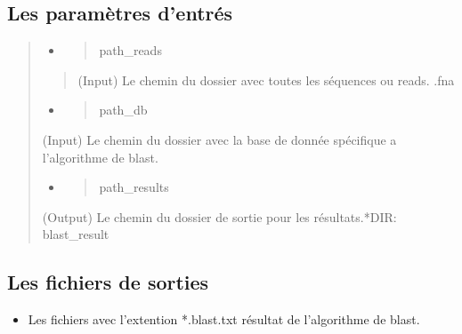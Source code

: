 \documentclass[letterpaper,10pt,french]{sphinxmanual}
\begin{document}
\subsection{Les paramètres d’entrés}
\label{\detokenize{bash/launch_blast_analyse.sh:les-parametres-d-entres}}\begin{quote}
\begin{itemize}
\item {} \begin{quote}\begin{description}
\item[{\sphinxhyphen{}path\_reads}] \leavevmode
\end{description}\end{quote}

\end{itemize}
\begin{quote}

(Input) Le chemin du dossier avec toutes les séquences ou reads. .fna
\end{quote}
\begin{itemize}
\item {} \begin{quote}\begin{description}
\item[{\sphinxhyphen{}path\_db}] \leavevmode
\end{description}\end{quote}

\end{itemize}

(Input) Le chemin du dossier avec la base de donnée spécifique a l’algorithme de blast.
\begin{itemize}
\item {} \begin{quote}\begin{description}
\item[{\sphinxhyphen{}path\_results}] \leavevmode
\end{description}\end{quote}

\end{itemize}

(Output) Le chemin du dossier de sortie pour les résultats.*DIR: blast\_result
\end{quote}


\subsection{Les fichiers de sorties}
\label{\detokenize{bash/launch_blast_analyse.sh:les-fichiers-de-sorties}}\begin{itemize}
\item {} 
Les fichiers avec l’extention *.blast.txt résultat de l’algorithme de blast.

\end{itemize}
\end{document}
